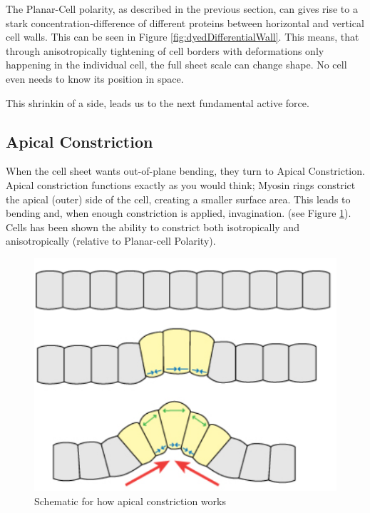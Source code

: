 The Planar-Cell polarity, as described in the previous section, can gives rise to a stark concentration-difference of different proteins between horizontal and vertical cell walls. This can be seen in Figure \ref{fig:dyedDifferentialWall}.
This means, that through anisotropically tightening of cell borders with deformations only happening in the individual cell, the full sheet scale can change shape. No cell even needs to know its position in space. 

This shrinkin of a side, leads us to the next fundamental active force.



\subsection{ Apical Constriction }
\label{sec:ApicalConstriction}
When the cell sheet wants out-of-plane bending, they turn to Apical Constriction. Apical constriction functions exactly as you would think; Myosin rings constrict the apical (outer) side of the cell, creating a smaller surface area. This leads to bending and, when enough constriction is applied, invagination. (see Figure \ref{fig:apical-constriction}). Cells has been shown the ability to constrict both isotropically and anisotropically (relative to Planar-cell Polarity).

\begin{figure}[H]
    \centering
    \includegraphics[width=0.3\linewidth]{chapters/Theory/figures/apical_constriction_schematic.png}
    \caption{Schematic for how apical constriction works}
    \label{fig:apical-constriction}
\end{figure}



